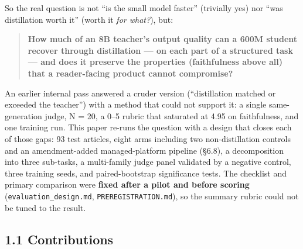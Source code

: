 \documentclass[11pt]{article}
\begin{document}
So the real question is not ``is the small model faster'' (trivially
yes) nor ``was distillation worth it'' (worth it \emph{for what?}), but:

\begin{quote}
\textbf{How much of an 8B teacher's output quality can a 600M student
recover through distillation --- on each part of a structured task ---
and does it preserve the properties (faithfulness above all) that a
reader-facing product cannot compromise?}
\end{quote}

An earlier internal pass answered a cruder version (``distillation
matched or exceeded the teacher'') with a method that could not support
it: a single same-generation judge, N = 20, a 0--5 rubric that saturated
at 4.95 on faithfulness, and one training run. This paper re-runs the
question with a design that closes each of those gaps: 93 test articles,
eight arms including two non-distillation controls and an
amendment-added managed-platform pipeline (§6.8), a decomposition into
three sub-tasks, a multi-family judge panel validated by a negative
control, three training seeds, and paired-bootstrap significance tests.
The checklist and primary comparison were \textbf{fixed after a pilot
and before scoring} (\texttt{evaluation\_design.md},
\texttt{PREREGISTRATION.md}), so the summary rubric could not be tuned
to the result.

\subsection{1.1 Contributions}\label{contributions}
\end{document}
